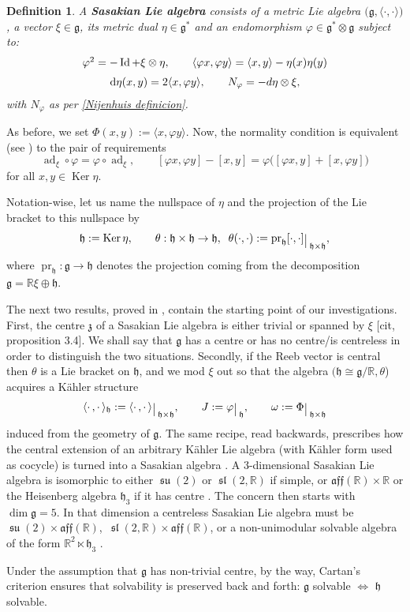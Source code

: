 \documentclass[12pt, twoside]{amsart}
\def\D{\textup{d}}
\def\z{\mathfrak{z}}
\def\g{\mathfrak{g}}
\def\h{\mathfrak{h}}
\def\R{\mathbb{R}}
\def\ad{\operatorname{ad}}
\DeclareMathOperator{\Id}{\operatorname{Id}}
\def\Ker{\operatorname{Ker}}
\newcommand{\lie}[1]{\mathfrak{#1}}
\DeclareMathOperator{\slie}{\lie{sl}}
\DeclareMathOperator{\su}{\lie{su}}
\def\aff{\mathfrak{aff}}
\def\pint{\langle \cdotp,\cdotp \rangle }
\newcommand{\iso}{\cong}
\newcommand{\restr}{\raisebox{-.2em}{$\!\big\arrowvert$}}
\newtheorem{definition}{\bf Definition}[section]
\theoremstyle{definition}
\begin{document}
\begin{definition} A {\bf Sasakian Lie algebra} consists of a metric Lie algebra $\big(\g, \pint\big)$, a vector $\xi\in\g$, its metric dual $\eta \in \g^*$ and an endomorphism $\varphi \in \g^*\otimes\g$ subject to:
$$\begin{array}{cc}
 \varphi^{2}=-\Id +\xi\otimes \eta, \qquad
\langle \varphi x, \varphi y\rangle= \langle x, y \rangle - \eta(x)\eta(y)\\[2mm]
\D \eta(x,y) = 2 \langle x,\varphi y\rangle, \qquad N_{\varphi}=-d\eta \otimes \xi,
\end{array}$$
with $N_\varphi$ as per \eqref{Nijenhuis definicion}. 
\end{definition}
As before, we set $\Phi(x,y):=\langle x,\varphi y\rangle$. Now, the normality  condition is equivalent (see \cite[Proposition 3.1]{AD}) to the pair of requirements 
$$\ad_{\xi}\circ \varphi=\varphi \circ \ad_{\xi}, \qquad
[\varphi x, \varphi y]-[x,y]=\varphi\big([\varphi x,y]+[x,\varphi y]\big)$$
for all $x,y \in \Ker \eta$.
\medbreak

Notation-wise, let us name the nullspace of $\eta$ and the projection of the Lie bracket to this nullspace by 
$$ \h:= \Ker\eta, \qquad \theta: \h\times \h\to \h, \;\; \theta(\cdot,\cdot):= \operatorname{pr}_\h [\cdot,\cdot]\restr_{\h\times \h},
$$
where $\operatorname{pr}_\h:\g\to\h$ denotes the projection coming from the decomposition $\g=\R\xi\oplus \h$. 

The next two results, proved in \cite{AFV}, contain the starting point of our investigations. First, the centre $\z$ of a Sasakian Lie algebra is either trivial or  spanned by $\xi$ [cit, proposition 3.4].
We shall say that $\g$ has a centre or has no centre/is centreless in order to distinguish the two situations. Secondly, if the Reeb vector is central then $\theta$ is a Lie bracket on $\h$, and we mod $\xi$ out so that the algebra $(\h\iso \g/\R, \theta$) acquires a K{\"a}hler structure
$$ \pint_{\h}:=\pint\restr_{\h\times\h},\qquad J:=\varphi \restr_\h, \qquad \omega:= \Phi\restr_{\h\times\h}$$ 
induced from the geometry of $\g$. 
The same recipe, read backwards, prescribes how the central extension of an arbitrary K{\"a}hler Lie algebra (with K{\"a}hler form used as cocycle) is turned into a Sasakian algebra \cite{AFV}.
A $3$-dimensional Sasakian Lie algebra is isomorphic to either $\su(2)$ or $\slie(2, \R)$ if simple, or $\aff(\R) \times \R$ or the Heisenberg algebra $\h_3$ if it has centre \cite{Geiges, Cho-Chun}. The concern then starts with $\dim\g=5$. In that dimension a centreless Sasakian Lie algebra must be $\su(2) \times \aff(\R)$,\ $\slie(2, \R)\times \aff(\R)$, or a non-unimodular solvable algebra of the form $\R^2\ltimes \h_3$ \cite{AFV}. \par
\quad Under the assumption that $\g$ has non-trivial centre, by the way, Cartan's criterion ensures that solvability is preserved back and forth: $\g$ solvable $\iff$ $\h$ solvable.
\medbreak 
\end{document}
